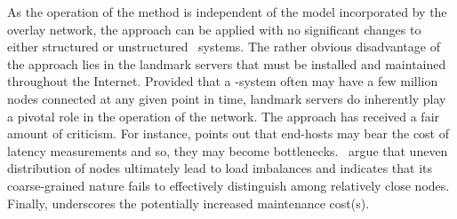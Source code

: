 As the operation of the method is independent of the model 
incorporated by the overlay network, the approach can be
applied with no significant changes to either
structured or unstructured \p\ systems.
The rather obvious disadvantage of the approach lies in the
landmark servers that must be installed and maintained throughout the Internet.
Provided that a \p-system often may have a few million nodes 
connected at any given point in time, landmark servers do 
inherently play a pivotal role in the operation of the network. 
The approach has received a fair amount of criticism.
For instance, \cite{GSG2002} points out that end-hosts may bear the
cost of latency measurements and so, they may become bottlenecks.
\cite{CDCR2002,M2003,ZZZSZ2004}~argue that uneven distribution of nodes 
ultimately lead to load imbalances and \cite{RGJZ2004} indicates 
that its coarse-grained nature fails to
effectively distinguish among relatively close nodes.
Finally, \cite{XTZ2003} underscores the potentially increased maintenance cost(s).
%
%
%
%
